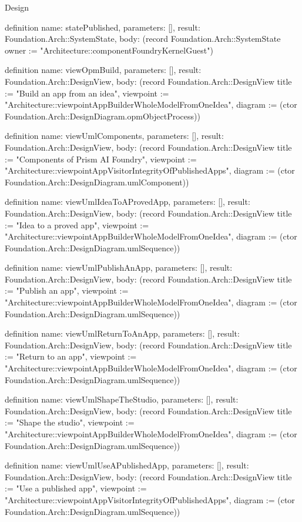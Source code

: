 \begin{lexlean}{Design}
\begin{semanticmodule}
definition{
  name: statePublished,
  parameters: [],
  result: Foundation.Arch::SystemState,
  body: (record Foundation.Arch::SystemState {owner := "Architecture::componentFoundryKernelGuest"})
}

definition{
  name: viewOpmBuild,
  parameters: [],
  result: Foundation.Arch::DesignView,
  body: (record Foundation.Arch::DesignView {title := "Build an app from an idea", viewpoint := "Architecture::viewpointAppBuilderWholeModelFromOneIdea", diagram := (ctor Foundation.Arch::DesignDiagram.opmObjectProcess)})
}

definition{
  name: viewUmlComponents,
  parameters: [],
  result: Foundation.Arch::DesignView,
  body: (record Foundation.Arch::DesignView {title := "Components of Prism AI Foundry", viewpoint := "Architecture::viewpointAppVisitorIntegrityOfPublishedApps", diagram := (ctor Foundation.Arch::DesignDiagram.umlComponent)})
}

definition{
  name: viewUmlIdeaToAProvedApp,
  parameters: [],
  result: Foundation.Arch::DesignView,
  body: (record Foundation.Arch::DesignView {title := "Idea to a proved app", viewpoint := "Architecture::viewpointAppBuilderWholeModelFromOneIdea", diagram := (ctor Foundation.Arch::DesignDiagram.umlSequence)})
}

definition{
  name: viewUmlPublishAnApp,
  parameters: [],
  result: Foundation.Arch::DesignView,
  body: (record Foundation.Arch::DesignView {title := "Publish an app", viewpoint := "Architecture::viewpointAppBuilderWholeModelFromOneIdea", diagram := (ctor Foundation.Arch::DesignDiagram.umlSequence)})
}

definition{
  name: viewUmlReturnToAnApp,
  parameters: [],
  result: Foundation.Arch::DesignView,
  body: (record Foundation.Arch::DesignView {title := "Return to an app", viewpoint := "Architecture::viewpointAppBuilderWholeModelFromOneIdea", diagram := (ctor Foundation.Arch::DesignDiagram.umlSequence)})
}

definition{
  name: viewUmlShapeTheStudio,
  parameters: [],
  result: Foundation.Arch::DesignView,
  body: (record Foundation.Arch::DesignView {title := "Shape the studio", viewpoint := "Architecture::viewpointAppBuilderWholeModelFromOneIdea", diagram := (ctor Foundation.Arch::DesignDiagram.umlSequence)})
}

definition{
  name: viewUmlUseAPublishedApp,
  parameters: [],
  result: Foundation.Arch::DesignView,
  body: (record Foundation.Arch::DesignView {title := "Use a published app", viewpoint := "Architecture::viewpointAppVisitorIntegrityOfPublishedApps", diagram := (ctor Foundation.Arch::DesignDiagram.umlSequence)})
}


\end{semanticmodule}
\end{lexlean}
